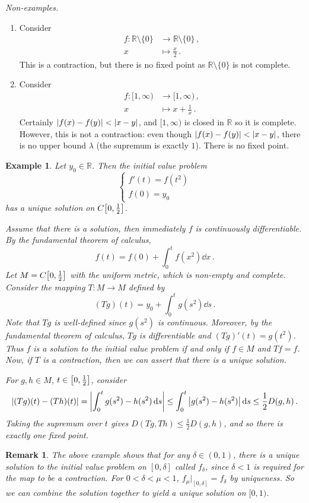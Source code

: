 \documentclass{article}
\theoremstyle{plain}\theoremheaderfont{\normalfont\itshape}\theorembodyfont{\rmfamily}\theoremseparator{.}\newtheorem*{rem}{Remark}\newtheorem*{ex}{Example}\newtheorem*{proof}{Proof}\newtheorem*{altp}{Alternative proof}
\theoremstyle{plain}\theoremheaderfont{\normalfont\bfseries}\theorembodyfont{\rmfamily}\theoremseparator{.}\newtheorem{thm}{Theorem}[section]\newtheorem{lem}[thm]{Lemma}\newtheorem{prop}[thm]{Proposition}\newtheorem*{cor}{Corollary}\newtheorem{defn}[thm]{Definition}\newtheorem{clm}[thm]{Claim}\newtheorem{clminproof}{Claim}
\theoremstyle{break}\theoremheaderfont{\normalfont\itshape}\theorembodyfont{\rmfamily}\theoremseparator{.\medskip}\newtheorem*{proofskip}{Proof}\newtheorem*{exs}{Examples}\newtheorem*{rems}{Remarks}
\theoremstyle{break}\theoremheaderfont{\normalfont\bfseries}\theorembodyfont{\rmfamily}\theoremseparator{.\medskip}\newtheorem{lemskip}[thm]{Lemma}\newtheorem{defnskip}[thm]{Definition}\newtheorem{propskip}[thm]{Proposition}\newtheorem{thmskip}[thm]{Theorem}
\begin{document}
    \textit{Non-examples.}
    \begin{enumerate}[label=(\roman*),topsep=0pt]
        \item Consider
        \begin{align*}
            f:\mathbb{R}\setminus\{0\}&\to\mathbb{R}\setminus\{0\}\,,\\
            x&\mapsto \frac{x}{2}\,.
        \end{align*}
        This is a contraction, but there is no fixed point as \(\mathbb{R}\setminus\{0\}\) is not complete.
        \item Consider
        \begin{align*}
            f:[1,\infty)&\to[1,\infty)\,,\\
            x&\mapsto x+\frac{1}{x}\,.
        \end{align*}
        Certainly \(\abs{f(x)-f(y)}<\abs{x-y}\), and \([1,\infty)\) is closed in \(\mathbb{R}\) so it is complete. However, this is not a contraction: even though \(\abs{f(x)-f(y)}<\abs{x-y}\), there is no upper bound \(\lambda\) (the supremum is exactly \(1\)). There is no fixed point.
    \end{enumerate}
    \begin{ex}
        Let \(y_0\in\mathbb{R}\). Then the initial value problem
        \[\begin{cases}
            f'(t)=f(t^2)\\
            f(0)=y_0
        \end{cases}\]
        has a unique solution on \(C\qty[0,\frac{1}{2}]\).

        Assume that there is a solution, then immediately \(f\) is continuously differentiable. By the fundamental theorem of calculus,
        \[f(t)=f(0)+\int_{0}^{t}f(x^2)\dd{x}\,.\]
        Let \(M=C\qty[0,\frac{1}{2}]\) with the uniform metric, which is non-empty and complete. Consider the mapping \(T:M\to M\) defined by
        \[(Tg)(t)=y_0+\int_{0}^{t}g(s^2)\dd{s}\,.\]
        Note that \(Tg\) is well-defined since \(g(s^2)\) is continuous. Moreover, by the fundamental theorem of calculus, \(Tg\) is differentiable and \((Tg)'(t)=g(t^2)\). Thus \(f\) is a solution to the initial value problem if and only if \(f\in M\) and \(Tf=f\). Now, if \(T\) is a contraction, then we can assert that there is a unique solution.

        For \(g,h\in M\), \(t\in\qty[0,\frac{1}{2}]\), consider
        \[\abs{(Tg)(t)-(Th)(t)}=\abs{\int_{0}^{t}g(s^2)-h(s^2)\dd{s}}\le\int_{0}^{t}\abs{g(s^2)-h(s^2)}\dd{s}\le\frac{1}{2}D(g,h)\,.\]
        Taking the supremum over \(t\) gives \(D(Tg,Th)\le\frac{1}{2}D(g,h)\), and so there is exactly one fixed point.
    \end{ex}
    \begin{rem}
        The above example shows that for any \(\delta\in(0,1)\), there is a unique solution to the initial value problem on \([0,\delta]\) called \(f_\delta\), since \(\delta<1\) is required for the map to be a contraction. For \(0<\delta<\mu<1\), \(f_\mu|_{[0,\delta]}=f_\delta\) by uniqueness. So we can combine the solution together to yield a unique solution on \([0,1)\).
    \end{rem}
\end{document}
